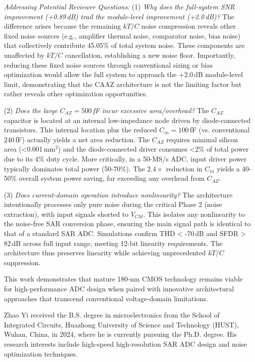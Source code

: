 \documentclass[journal]{IEEEtran}
\begin{document}
\textit{Addressing Potential Reviewer Questions:}
(1) \textit{Why does the full-system SNR improvement (+0.89\,dB) trail the module-level improvement (+2.0\,dB)?} The difference arises because the remaining $kT/C$ noise compression reveals other fixed noise sources (e.g., amplifier thermal noise, comparator noise, bias noise) that collectively contribute 45.05\% of total system noise. These components are unaffected by $kT/C$ cancellation, establishing a new noise floor. Importantly, reducing these fixed noise sources through conventional sizing or bias optimization would allow the full system to approach the +2.0\,dB module-level limit, demonstrating that the CAAZ architecture is not the limiting factor but rather reveals other optimization opportunities.

(2) \textit{Does the large $C_{AZ} = 500$\,fF incur excessive area/overhead?} The $C_{AZ}$ capacitor is located at an internal low-impedance node driven by diode-connected transistors. This internal location plus the reduced $C_{in}=100$\,fF (vs. conventional 240\,fF) actually yields a net area reduction. The $C_{AZ}$ requires minimal silicon area (<0.001\,mm$^2$) and the diode-connected driver consumes <2\% of total power due to its 4\% duty cycle. More critically, in a 50-MS/s ADC, input driver power typically dominates total power (50-70\%). The $2.4\times$ reduction in $C_{in}$ yields a 40-50\% overall system power saving, far exceeding any overhead from $C_{AZ}$.

(3) \textit{Does current-domain operation introduce nonlinearity?} The architecture intentionally processes only pure noise during the critical Phase 2 (noise extraction), with input signals shorted to $V_{CM}$. This isolates any nonlinearity to the noise-free SAR conversion phase, ensuring the main signal path is identical to that of a standard SAR ADC. Simulations confirm THD < -70\,dB and SFDR > 82\,dB across full input range, meeting 12-bit linearity requirements. The architecture thus preserves linearity while achieving unprecedented $kT/C$ suppression.

This work demonstrates that mature 180-nm CMOS technology remains viable for high-performance ADC design when paired with innovative architectural approaches that transcend conventional voltage-domain limitations.

\IEEEpubidadjcol

\begin{IEEEbiography}{Zhao Yi} received the B.S. degree in microelectronics from the School of Integrated Circuits, Huazhong University of Science and Technology (HUST), Wuhan, China, in 2024, where he is currently pursuing the Ph.D. degree. His research interests include high-speed high-resolution SAR ADC design and noise optimization techniques.
\end{IEEEbiography}



\end{document}
